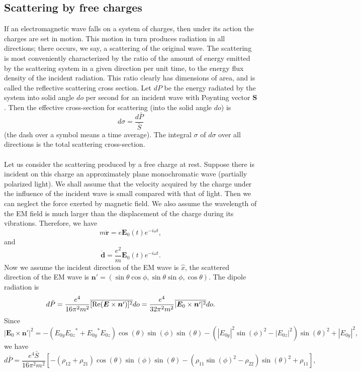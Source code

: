 \subsection{Scattering by free charges}
If an electromagnetic wave falls on a system of charges, then under its action the charges are set in motion. This motion in turn produces radiation in all directions; there occurs, we say, a scattering of the original wave. 
The scattering is most conveniently characterized by the ratio of the amount of energy emitted by the scattering system in a given direction per unit time, to the energy flux density of the incident radiation. This ratio clearly has dimensions of area, and is called the reflective
scattering cross section. 
Let $dP$ be the energy radiated by the system into solid angle $do$ per second for an incident wave with Poynting vector $\bm{S}$. Then the effective cross-section for scattering (into the solid angle $do$) is
\[d\sigma = \frac{d\bar{P}}{\bar{S}} \]
(the dash over a symbol means a time average). 
The integral $\sigma$ of $d\sigma$ over all directions is the total scattering cross-section.
\\ \\
Let us consider the scattering produced by a free charge at rest. Suppose there is incident on this charge an approximately plane monochromatic wave (partially polarized light). We shall assume that the velocity acquired by the charge under the influence of the incident wave is small compared with that of light. Then we can neglect the force exerted by magnetic field. We also assume the wavelength of the EM field is much larger than the displacement of the charge during its vibrations. 
Therefore, we have
\[m\ddot{\bm{r}} = e\bm{E}_0(t) e^{-i\omega t},\]
and
\[\ddot{\bm{d}} = \frac{e^2}{m} \bm{E}_0(t) e^{-i\omega t}.\]
Now we assume the incident direction of the EM wave is $\hat{x}$, the scattered direction of the EM wave is $\bm{n}' =(\sin\theta\cos\phi,\sin\theta\sin\phi,\cos\theta)$.
The dipole radiation is
\[d\bar{P} = \frac{e^4}{16\pi^2 m^2}\overline{{[\rm Re}(\bm{E}\times\bm{n}')]^2} do = \frac{e^4}{32\pi^2 m^2}\overline{|\bm{E}_0\times\bm{n}'|^2} do.\]
Since
\[|\bm{E}_0\times\bm{n}'|^2 = - ({E_{0y}} {E_{0z}}^* + {E_{0y}}^* {E_{0z}}) \cos\left({\theta}\right) \sin\left({\phi}\right)
\sin\left({\theta}\right) - {\left(|E_{0y}|^{2} \sin\left({\phi}\right)^{2}
- |E_{0z}|^{2}\right)} \sin\left({\theta}\right)^{2} + |E_{0y}|^{2},\]
we have
\[d\bar{P} = \frac{e^4 \bar{S}}{16\pi^2 m^2}[-(\rho_{12}+\rho_{21})\cos\left({\theta}\right)\sin\left({\phi}\right)
\sin\left({\theta}\right) - {\left(\rho_{11} \sin\left({\phi}\right)^{2}
- \rho_{22}\right)} \sin\left({\theta}\right)^{2} + \rho_{11} ],\]
